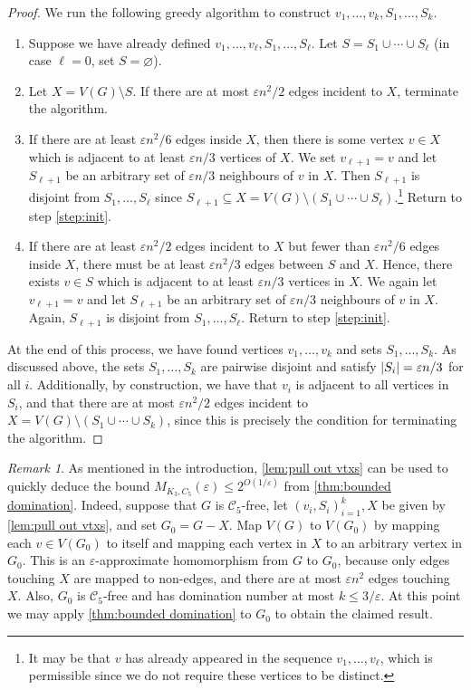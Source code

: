 \documentclass[reqno, english, 12pt]{amsart}
\theoremstyle{plain}
\theoremstyle{remark}
\newtheorem*{remark}{Remark}
\DeclarePairedDelimiter{\abs}{\lvert}{\rvert}
\renewcommand{\leq}{\leqslant}
\newcommand\C{\mathscr{C}}
\begin{document}
\begin{proof}
	We run the following greedy algorithm to construct $v_1,\dots,v_k,S_1,\dots,S_k$. 
	\begin{enumerate}
		\item Suppose we have already defined $v_1,\dots,v_\ell,S_1,\dots,S_\ell$. Let $S = S_1 \cup \dotsb \cup S_\ell$ (in case $\ell=0$, set $S=\varnothing$).\label{step:init}
		\item Let $X = V(G) \setminus S$. If there are at most $\varepsilon n^2/2$ edges incident to $X$, terminate the algorithm.
		\item If there are at least $\varepsilon n^2/6$ edges inside $X$, then there is some vertex $v \in X$ which is adjacent to at least $\varepsilon n/3$ vertices of $X$. We set $v_{\ell+1}=v$ and let $S_{\ell+1}$ be an arbitrary set of $\varepsilon n/3$ neighbours of $v$ in $X$. Then $S_{\ell+1}$ is disjoint from $S_1,\dots,S_\ell$ since $S_{\ell+1} \subseteq X = V(G) \setminus(S_1 \cup \dotsb \cup S_\ell)$.\footnote{It may be that $v$ has already appeared in the sequence $v_1,\dots,v_\ell$, which is permissible since we do not require these vertices to be distinct.} Return to step \ref{step:init}.
		\item If there are at least $\varepsilon n^2/2$ edges incident to $X$ but fewer than $\varepsilon n^2/6$ edges inside $X$, there must be at least $\varepsilon n^2/3$ edges between $S$ and $X$. Hence, there exists 
        $v \in S$ which is adjacent to at least $\varepsilon n/3$ vertices in $X$. We again let $v_{\ell+1}=v$ and let $S_{\ell+1}$ be an arbitrary set of $\varepsilon n/3$ neighbours of $v$ in $X$. Again, $S_{\ell+1}$ is disjoint from $S_1,\dots,S_\ell$. Return to step \ref{step:init}.
	\end{enumerate}
	At the end of this process, we have found vertices $v_1,\dots,v_k$ and sets $S_1,\dots,S_k$. As discussed above, the sets $S_1,\dots,S_k$ are pairwise disjoint and satisfy $\abs{S_i}=\varepsilon n/3$ for all $i$. 
    Additionally, by construction, we have that $v_i$ is adjacent to all vertices in $S_i$, and that there are at most $\varepsilon n^2/2$ edges incident to $X=V(G)\setminus (S_1\cup \dotsb \cup S_k)$, since this is precisely the condition for terminating the algorithm.
\end{proof}

\begin{remark}
    As mentioned in the introduction, \cref{lem:pull out vtxs} can be used to quickly deduce the bound $M_{K_3,C_5}(\varepsilon) \leq 2^{O(1/\varepsilon)}$ from \cref{thm:bounded domination}. Indeed, suppose that $G$ is $\C_5$-free, let $(v_i,S_i)_{i=1}^k,X$ be given by \cref{lem:pull out vtxs}, and set $G_0 = G - X$. Map $V(G)$ to $V(G_0)$ by mapping each $v \in V(G_0)$ to itself and mapping each vertex in $X$ to an arbitrary vertex in $G_0$. This is an $\varepsilon$-approximate homomorphism from $G$ to $G_0$, because only edges touching $X$ are mapped to non-edges, and there are at most $\varepsilon n^2$ edges touching $X$. Also, $G_0$ is $\C_5$-free and has domination number at most $k \leq 3/\varepsilon$. 
At this point we may apply \cref{thm:bounded domination} to $G_0$ to obtain the claimed result. 
\end{remark}
\end{document}
